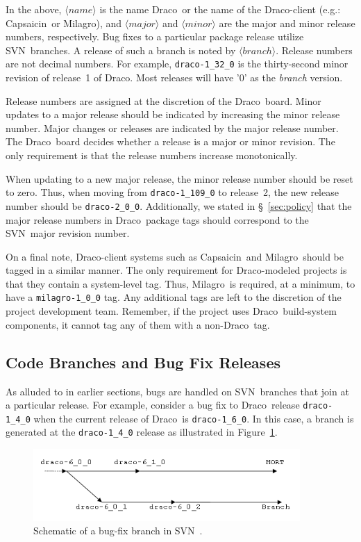 \documentclass[note]{ResearchNote_pdf}
\newcommand{\draco}{{\normalfont\small\sffamily Draco}}
\newcommand{\milagro}{{\normalfont\small\sffamily Milagro}}
\newcommand{\capsaicin}{{\normalfont\small\sffamily Capsaicin}}
\newcommand{\svn}{\textsf{SVN}}
\begin{document}
In the above, $\langle\mathit{name}\rangle$ is the name \draco\ or the
name of the \draco-client (e.g.: \capsaicin\ or \milagro), and
$\langle\mathit{major}\rangle$ and $\langle\mathit{minor}\rangle$ are
the major and minor release numbers, respectively. Bug fixes to a
particular package release utilize \svn\  branches.  A release of
such a branch is noted by $\langle\mathit{branch}\rangle$.  Release
numbers are not decimal numbers.  For example, \texttt{draco-1\_32\_0}
is the thirty-second minor revision of release~1 of \draco.  Most
releases will have '0' as the \textit{branch} version.

Release numbers are assigned at the discretion of the \draco\ board.
Minor updates to a major release should be indicated by increasing the
minor release number.  Major changes or releases are indicated by the
major release number.  The \draco\ board decides whether a release is
a major or minor revision.  The only requirement is that the release
numbers increase monotonically.

When updating to a new major release, the minor release number should
be reset to zero.  Thus, when moving from \texttt{draco-1\_109\_0} to
release~2, the new release number should be \texttt{draco-2\_0\_0}.
Additionally, we stated in \S~\ref{sec:policy} that the major release
numbers in \draco\ package tags should correspond to the \svn\ major
revision number. 

On a final note, \draco-client systems such as \capsaicin\ and
\milagro\ should be tagged in a similar manner.  The only requirement
for \draco-modeled projects is that they contain a system-level tag.
Thus, \milagro\ is required, at a minimum, to have a
\texttt{milagro-1\_0\_0} tag.  Any additional tags are left to the
discretion of the project development team.  Remember, if the project
uses \draco\ build-system components, it cannot tag any of them with a
non-\draco\ tag.


\subsection{Code Branches and Bug Fix Releases}
\label{sec:code_branch}

As alluded to in earlier sections, bugs are handled on \svn\ branches
that join at a particular release.  For example, consider a bug fix to
\draco\ release \texttt{draco-1\_4\_0} when the current release of
\draco\ is \texttt{draco-1\_6\_0}.  In this case, a branch is
generated at the \texttt{draco-1\_4\_0} release as illustrated in
Figure~\ref{fig:branch}.
\begin{figure}
  \centerline{\includegraphics[width=4in]{branch-example.png}}
  \caption{Schematic of a bug-fix branch in \svn\ .}
  \label{fig:branch}
\end{figure}
\end{document}
